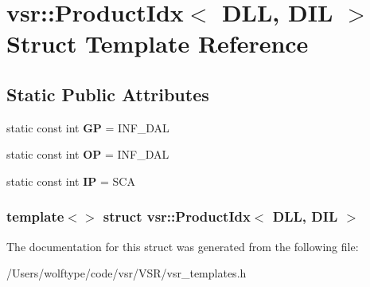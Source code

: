 \hypertarget{structvsr_1_1_product_idx_3_01_d_l_l_00_01_d_i_l_01_4}{\section{vsr\-:\-:Product\-Idx$<$ D\-L\-L, D\-I\-L $>$ Struct Template Reference}
\label{structvsr_1_1_product_idx_3_01_d_l_l_00_01_d_i_l_01_4}
}
\subsection*{Static Public Attributes}
\begin{DoxyCompactItemize}
\item 
\hypertarget{structvsr_1_1_product_idx_3_01_d_l_l_00_01_d_i_l_01_4_adcbc6ea0ce36e65640d1632f9f12e89e}{static const int {\bfseries G\-P} = I\-N\-F\-\_\-\-D\-A\-L}\label{structvsr_1_1_product_idx_3_01_d_l_l_00_01_d_i_l_01_4_adcbc6ea0ce36e65640d1632f9f12e89e}

\item 
\hypertarget{structvsr_1_1_product_idx_3_01_d_l_l_00_01_d_i_l_01_4_af21c92a8e012f1ad9689c32b5548f7ca}{static const int {\bfseries O\-P} = I\-N\-F\-\_\-\-D\-A\-L}\label{structvsr_1_1_product_idx_3_01_d_l_l_00_01_d_i_l_01_4_af21c92a8e012f1ad9689c32b5548f7ca}

\item 
\hypertarget{structvsr_1_1_product_idx_3_01_d_l_l_00_01_d_i_l_01_4_a61b70262b5817a8b8f91ab17cc157396}{static const int {\bfseries I\-P} = S\-C\-A}\label{structvsr_1_1_product_idx_3_01_d_l_l_00_01_d_i_l_01_4_a61b70262b5817a8b8f91ab17cc157396}

\end{DoxyCompactItemize}
\subsubsection*{template$<$$>$ struct vsr\-::\-Product\-Idx$<$ D\-L\-L, D\-I\-L $>$}



The documentation for this struct was generated from the following file\-:\begin{DoxyCompactItemize}
\item 
/\-Users/wolftype/code/vsr/\-V\-S\-R/vsr\-\_\-templates.\-h\end{DoxyCompactItemize}
